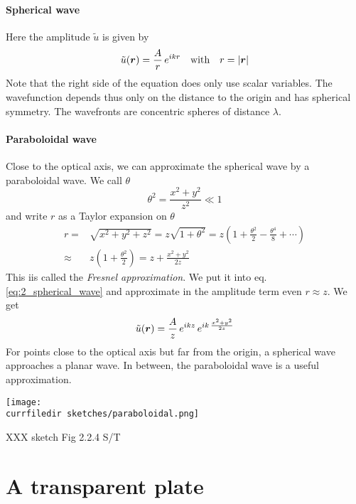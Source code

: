 \paragraph*{Spherical wave} Here the amplitude $\tilde{u}$ is given by
\begin{equation}
 \tilde{u}(\boldsymbol{r}) = \frac{A}{r} \, e^{i k r} \quad \text{with} \quad r = |\boldsymbol{r}|
 \label{eq:2_spherical_wave}
\end{equation}
Note that the right side of the equation does only use scalar variables. The wavefunction depends thus only on the distance to the origin and has spherical symmetry. The wavefronts are concentric spheres of distance $\lambda$.

\paragraph*{Paraboloidal wave} Close to the optical axis, we can approximate the spherical wave by a paraboloidal wave. We call $\theta$
\begin{equation}
    \theta^2 =  \frac{x^2 + y^2}{z^2} \ll 1
\end{equation}
and write $r$ as a Taylor expansion on $\theta$
\begin{align}
    r = & \sqrt{x^2 + y^2 + z^2}= z \sqrt{1 + \theta^2}
    = z \left( 1 + \frac{\theta^2}{2} - \frac{\theta^4}{8} + \cdots \right) \\
    \approx & z \left( 1 + \frac{\theta^2}{2} \right) = z + \frac{x^2 + y^2}{2z} 
\end{align}
This iis called the \emph{Fresnel approximation}. We put it into eq.  \ref{eq:2_spherical_wave} and approximate in the amplitude term even $r \approx z$. We get
\begin{equation}
    \tilde{u}(\boldsymbol{r}) = \frac{A}{z} \, e^{i k z} \, e^{i k \, \frac{x^2 + y^2}{2z}  }
\end{equation}
For points close to the optical axis but far from the origin, a spherical wave approaches a planar wave. In between, the paraboloidal wave is a useful approximation.


\begin{marginfigure}
    \texttt{[image: \\currfiledir sketches/paraboloidal.png]}
   \caption{XXX sketch Fig 2.2.4 S/T}
\end{marginfigure}


\section{A transparent plate}

